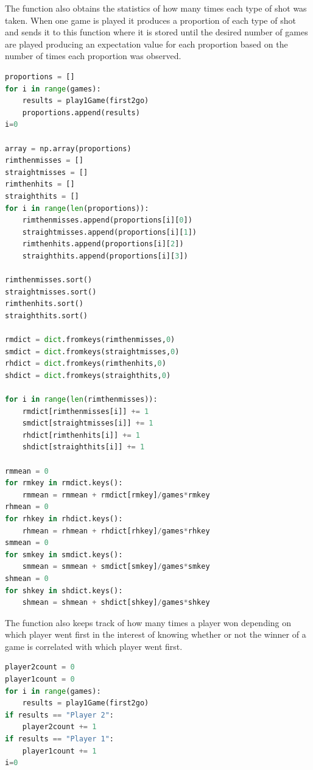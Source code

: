 \documentclass{article}
\begin{document}
The function also obtains the statistics of how many times each type of shot was taken. When one game is played it produces a proportion of each type of shot and sends it to this function where it is stored until the desired number of games are played producing an expectation value for each proportion based on the number of times each proportion was observed.
\begin{lstlisting}[language=Python]
proportions = []
for i in range(games):
    results = play1Game(first2go)
    proportions.append(results)
i=0

array = np.array(proportions)
rimthenmisses = []
straightmisses = []
rimthenhits = []
straighthits = []
for i in range(len(proportions)):
    rimthenmisses.append(proportions[i][0])
    straightmisses.append(proportions[i][1])
    rimthenhits.append(proportions[i][2])
    straighthits.append(proportions[i][3])

rimthenmisses.sort()
straightmisses.sort()
rimthenhits.sort()
straighthits.sort()

rmdict = dict.fromkeys(rimthenmisses,0)
smdict = dict.fromkeys(straightmisses,0)
rhdict = dict.fromkeys(rimthenhits,0)
shdict = dict.fromkeys(straighthits,0)

for i in range(len(rimthenmisses)):
    rmdict[rimthenmisses[i]] += 1
    smdict[straightmisses[i]] += 1
    rhdict[rimthenhits[i]] += 1
    shdict[straighthits[i]] += 1

rmmean = 0
for rmkey in rmdict.keys():
    rmmean = rmmean + rmdict[rmkey]/games*rmkey
rhmean = 0
for rhkey in rhdict.keys():
    rhmean = rhmean + rhdict[rhkey]/games*rhkey
smmean = 0
for smkey in smdict.keys():
    smmean = smmean + smdict[smkey]/games*smkey
shmean = 0
for shkey in shdict.keys():
    shmean = shmean + shdict[shkey]/games*shkey
\end{lstlisting}

The function also keeps track of how many times a player won depending on which player went first in the interest of knowing whether or not the winner of a game is correlated with which player went first.
\begin{lstlisting}[language=Python]
player2count = 0
player1count = 0
for i in range(games):
    results = play1Game(first2go)
if results == "Player 2":
    player2count += 1
if results == "Player 1":
    player1count += 1
i=0
\end{lstlisting}
\end{document}
